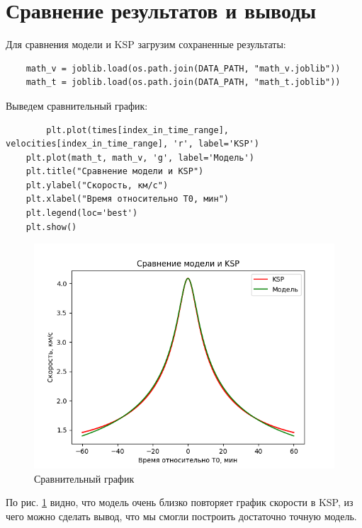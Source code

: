 \documentclass{article}
\begin{document}
    \section{Сравнение результатов и выводы}
    Для сравнения модели и KSP загрузим сохраненные результаты:
    \begin{verbatim}
    math_v = joblib.load(os.path.join(DATA_PATH, "math_v.joblib"))
    math_t = joblib.load(os.path.join(DATA_PATH, "math_t.joblib"))
    \end{verbatim}
    Выведем сравнительный график:
    \begin{verbatim}
        plt.plot(times[index_in_time_range], velocities[index_in_time_range], 'r', label='KSP')
    plt.plot(math_t, math_v, 'g', label='Модель')
    plt.title("Сравнение модели и KSP")
    plt.ylabel("Скорость, км/с")
    plt.xlabel("Время относительно T0, мин")
    plt.legend(loc='best')
    plt.show()
    \end{verbatim}
    \begin{figure}
        \centering
        \includegraphics[width=0.75\linewidth]{images/compare_math_ksp_speed.png}
        \caption{Сравнительный график}
        \label{fig:compare}
    \end{figure}
    По рис. \ref{fig:compare} видно, что модель очень близко повторяет график скорости в KSP, из чего можно сделать вывод, что мы смогли построить достаточно точную модель.
    \newpage
    \nocite{*}
    \printbibliography
\end{document}
